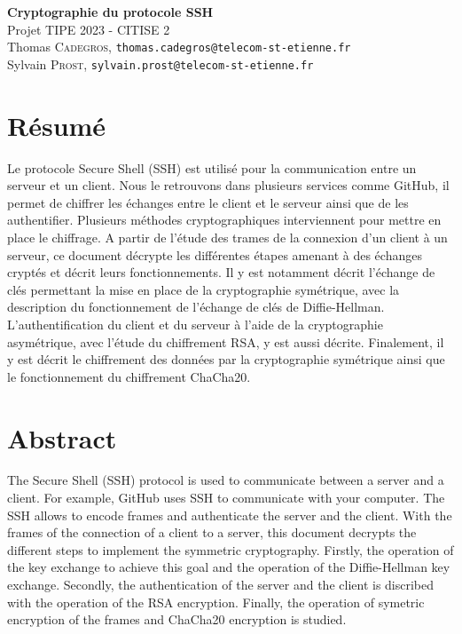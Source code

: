 \begin{center}
    \huge{\textbf{Cryptographie du protocole SSH}}\\
    \large Projet TIPE 2023 - CITISE 2\\[5pt]
    \normalsize 
    Thomas \textsc{Cadegros}, \texttt{thomas.cadegros@telecom-st-etienne.fr}\\
    Sylvain \textsc{Prost}, \texttt{sylvain.prost@telecom-st-etienne.fr}
\end{center}

\section*{Résumé}
Le protocole Secure Shell (SSH) est utilisé pour la communication entre un serveur et un client. Nous le retrouvons dans plusieurs services comme GitHub, il permet de chiffrer les échanges entre le client et le serveur ainsi que de les authentifier. Plusieurs méthodes cryptographiques interviennent pour mettre en place le chiffrage. A partir de l'étude des trames de la connexion d'un client à un serveur, ce document décrypte les différentes étapes amenant à des échanges cryptés et décrit leurs fonctionnements. Il y est notamment décrit l'échange de clés permettant la mise en place de la cryptographie symétrique, avec la description du fonctionnement de l'échange de clés de Diffie-Hellman. L'authentification du client et du serveur à l'aide de la cryptographie asymétrique, avec l'étude du chiffrement RSA, y est aussi décrite. Finalement, il y est décrit le chiffrement des données par la cryptographie symétrique ainsi que le fonctionnement du chiffrement ChaCha20.


\section*{Abstract}
The Secure Shell (SSH) protocol is used to communicate between a server and a client. For example, GitHub uses SSH to communicate with your computer. The SSH allows to encode frames and authenticate the server and the client. With the frames of the connection of a client to a server, this document decrypts the different steps to implement the symmetric cryptography. Firstly, the operation of the key exchange to achieve this goal and the operation of the Diffie-Hellman key exchange. Secondly, the authentication of the server and the client is discribed with the operation of the RSA encryption. Finally, the operation of symetric encryption of the frames and ChaCha20 encryption is studied.

